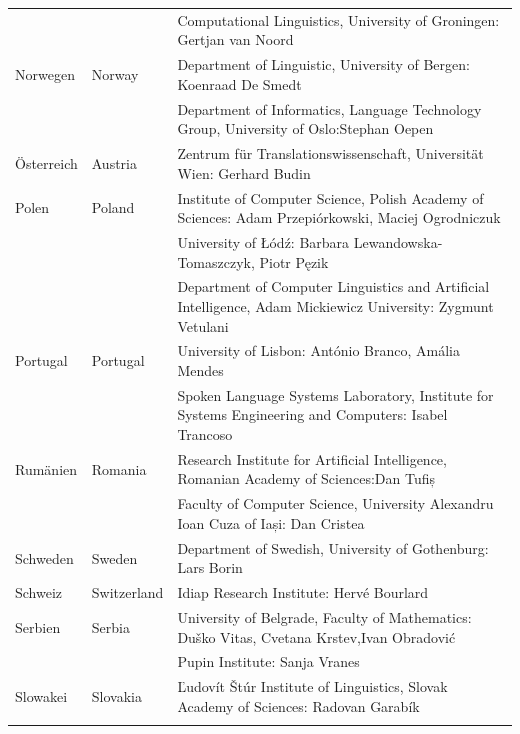 \begin{longtable}{@{}llp{113mm}@{}}
  & & Computational Linguistics, University of Groningen: Gertjan van Noord\\ \addlinespace
  Norwegen & \textcolor{grey1}{Norway} & Department of Linguistic, University of Bergen: Koenraad De Smedt\\ \addlinespace 
  & & Department of Informatics, Language Technology Group, University of Oslo:\newline Stephan Oepen \\ \addlinespace
  Österreich & \textcolor{grey1}{Austria} & Zentrum für Translationswissenschaft, Universität Wien: Gerhard Budin\\ \addlinespace 
  Polen & \textcolor{grey1}{Poland} & Institute of Computer Science, Polish Academy of Sciences: Adam Przepiórkowski, Maciej Ogrodniczuk \\ \addlinespace
  & & University of Łódź: Barbara Lewandowska-Tomaszczyk, Piotr Pęzik\\ \addlinespace
  & & Department of Computer Linguistics and Artificial Intelligence, Adam Mickiewicz University: Zygmunt Vetulani \\ \addlinespace
  Portugal & \textcolor{grey1}{Portugal} & University of Lisbon: António Branco, Amália Mendes \\ \addlinespace
  & & Spoken Language Systems Laboratory, Institute for Systems Engineering and Computers: Isabel Trancoso \\ \addlinespace
  Rumänien & \textcolor{grey1}{Romania} & Research Institute for Artificial Intelligence, Romanian Academy of Sciences:\newline Dan Tufiș \\ \addlinespace
  & & Faculty of Computer Science, University Alexandru Ioan Cuza of Iași: Dan Cristea \\ \addlinespace
  Schweden & \textcolor{grey1}{Sweden} & Department of Swedish, University of Gothenburg: Lars Borin \\ \addlinespace 
  Schweiz & \textcolor{grey1}{Switzerland} & Idiap Research Institute: Hervé Bourlard \\ \addlinespace 
  Serbien & \textcolor{grey1}{Serbia} & University of Belgrade, Faculty of Mathematics: Duško Vitas, Cvetana Krstev,\newline Ivan Obradović \\ \addlinespace
  & & Pupin Institute: Sanja Vranes \\ \addlinespace  
  Slowakei & \textcolor{grey1}{Slovakia} & Ľudovít Štúr Institute of Linguistics, Slovak Academy of Sciences: Radovan Garabík \\ \addlinespace 

\end{longtable}
